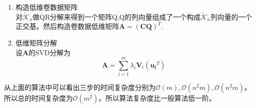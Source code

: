\documentclass[10pt,a4paper]{article}
\begin{document}
\begin{CJK*}{UTF8}{song}
\begin{enumerate}
\item  构造低维卷数据\cite{7}\cite{8}矩阵\\
对$\tilde{\mathcal{K}}_n$做QR分解来得到一个矩阵Q,Q的列向量组成了一个构成$\tilde{\mathcal{K}}_n$列向量的一个正交基。然后构造卷数据低维矩阵$\mathbf{A}=(\mathbf{C}\mathbf{Q})^T$.
\item 低维矩阵分解\\
设$\mathbf{A}$的SVD分解为
\begin{equation}
\mathbf{A}=\sum_{i=1}^m \lambda_i \mathbf{V}_i(\boldsymbol{u_i}^T)
\end{equation}
\end{enumerate}
从上面的算法中可以看出三步的时间复杂度分别为$\mathcal{O}(m),\mathcal{O}(n^2m),\mathcal{O}(n^2m)$。所以总的时间复杂度为$\mathcal{O}(m^2)$。所以算法复杂度比一般算法低一阶。



\end{CJK*}
\end{document}
